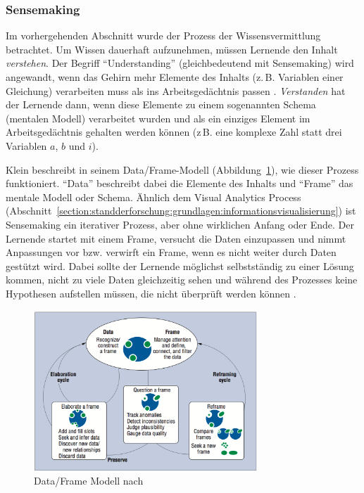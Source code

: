 \documentclass[
	headsepline,
	footsepline,
	fontsize=12pt,
	bibliography=totoc
]{scrbook}
\begin{document}
\subsubsection{Sensemaking}
\label{section:standderforschung:grundlagen:user_assistance:sensemaking}

Im vorhergehenden Abschnitt wurde der Prozess der Wissensvermittlung betrachtet. Um Wissen dauerhaft aufzunehmen, müssen Lernende den Inhalt \emph{verstehen}. Der Begriff \enquote{Understanding} (gleichbedeutend mit Sensemaking) wird angewandt, wenn das Gehirn mehr Elemente des Inhalts (z.\,B. Variablen einer Gleichung) verarbeiten muss als ins Arbeitsgedächtnis passen \cite{Sweller1998}. \emph{Verstanden} hat der Lernende dann, wenn diese Elemente zu einem sogenannten Schema (mentalen Modell) verarbeitet wurden und als ein einziges Element im Arbeitsgedächtnis gehalten werden können (z\,B. eine komplexe Zahl statt drei Variablen $a$, $b$ und $i$).


Klein \cite{Klein2006a} beschreibt in seinem Data/Frame-Modell (Abbildung~\ref{figure:data_frame_model}), wie dieser Prozess funktioniert. \enquote{Data} beschreibt dabei die Elemente des Inhalts und \enquote{Frame} das mentale Modell oder Schema. Ähnlich dem Visual Analytics Process (Abschnitt~\ref{section:standderforschung:grundlagen:informationsvisualisierung}) ist Sensemaking ein iterativer Prozess, aber ohne wirklichen Anfang oder Ende. Der Lernende startet mit einem Frame, versucht die Daten einzupassen und nimmt Anpassungen vor bzw. verwirft ein Frame, wenn es nicht weiter durch Daten gestützt wird. Dabei sollte der Lernende möglichst selbstständig zu einer Lösung kommen, nicht zu viele Daten gleichzeitig sehen und während des Prozesses keine Hypothesen aufstellen müssen, die nicht überprüft werden können \cite{Klein2006}.

\begin{figure}[htbp]
   \centering
   \includegraphics[width=0.75\textwidth]{images/grundlagen-data_frame_model.png}
   \caption{Data/Frame Modell nach \cite{Klein2006}}
   \label{figure:data_frame_model}
\end{figure}
\end{document}
